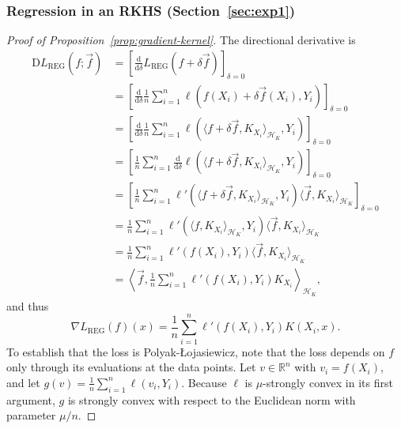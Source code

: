 \documentclass{article}
\newcommand{\R}{\mathbb{R}}
\newcommand{\D}{\mathrm{D}}
\newcommand{\dif}{\mathrm{d}}
\begin{document}
\subsubsection{Regression in an RKHS (Section~\ref{sec:exp1})}

\begin{proof}[Proof of Proposition~\ref{prop:gradient-kernel}]
    The directional derivative is
    \begin{align*}
        \D L_\mathrm{REG}(f; \vec{f})
        &= \left[ \frac{\dif}{\dif \delta} L_\mathrm{REG}(f + \delta \vec{f}) \right]_{\delta=0}
        \\ &= \left[ \frac{\dif}{\dif \delta} \frac{1}{n} \sum_{i=1}^n \ell(f(X_i) + \delta \vec{f}(X_i), Y_i) \right]_{\delta=0}
        \\ &= \left[ \frac{\dif}{\dif \delta} \frac{1}{n} \sum_{i=1}^n \ell(\langle f + \delta \vec{f}, K_{X_i} \rangle_{\mathcal{H}_K}, Y_i) \right]_{\delta=0}
        \\ &= \left[ \frac{1}{n} \sum_{i=1}^n \frac{\dif}{\dif \delta} \ell(\langle f + \delta \vec{f}, K_{X_i} \rangle_{\mathcal{H}_K}, Y_i) \right]_{\delta=0}
        \\ &= \left[ \frac{1}{n} \sum_{i=1}^n \ell'(\langle f + \delta \vec{f}, K_{X_i} \rangle_{\mathcal{H}_K}, Y_i) \langle \vec{f}, K_{X_i} \rangle_{\mathcal{H}_K} \right]_{\delta=0}
        \\ &= \frac{1}{n} \sum_{i=1}^n \ell'(\langle f, K_{X_i} \rangle_{\mathcal{H}_K}, Y_i) \langle \vec{f}, K_{X_i} \rangle_{\mathcal{H}_K}
        \\ &= \frac{1}{n} \sum_{i=1}^n \ell'(f(X_i), Y_i) \langle \vec{f}, K_{X_i} \rangle_{\mathcal{H}_K}
        \\ &= \left\langle \vec{f}, \frac{1}{n} \sum_{i=1}^n \ell'(f(X_i), Y_i) K_{X_i} \right\rangle_{\mathcal{H}_K},
    \end{align*}
    and thus
    \[ \nabla L_\mathrm{REG}(f)(x) = \frac{1}{n} \sum_{i=1}^n \ell'(f(X_i), Y_i) K(X_i, x). \]
    To establish that the loss is Polyak-Łojasiewicz, note that the loss depends on $f$ only through its evaluations at the data points. Let $v \in \R^n$ with $v_i = f(X_i)$, and let $g(v) = \frac{1}{n} \sum_{i=1}^n \ell(v_i, Y_i)$. Because $\ell$ is $\mu$-strongly convex in its first argument, $g$ is strongly convex with respect to the Euclidean norm with parameter $\mu/n$.


\end{proof}
\end{document}
